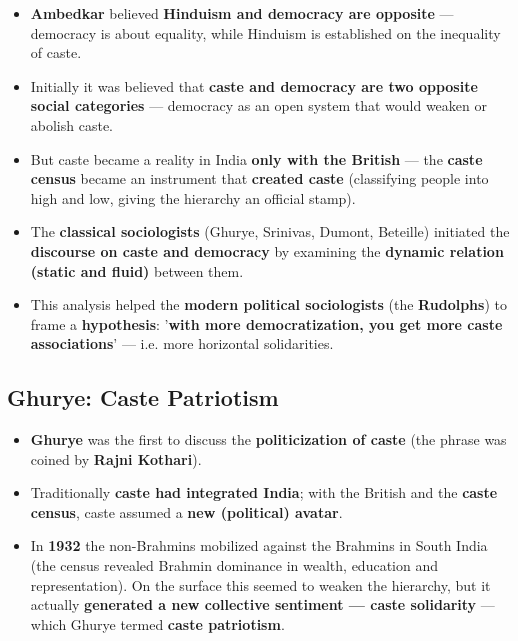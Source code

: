 \begin{KeyConcept}
\begin{itemize}
\item \textbf{Ambedkar} believed \textbf{Hinduism and democracy are opposite} --- democracy is about equality, while Hinduism is established on the inequality of caste.
\item Initially it was believed that \textbf{caste and democracy are two opposite social categories} --- democracy as an open system that would weaken or abolish caste.
\item But caste became a reality in India \textbf{only with the British} --- the \textbf{caste census} became an instrument that \textbf{created caste} (classifying people into high and low, giving the hierarchy an official stamp).
\end{itemize}
\end{KeyConcept}

\begin{KeyConcept}
\begin{itemize}
\item The \textbf{classical sociologists} (Ghurye, Srinivas, Dumont, Beteille) initiated the \textbf{discourse on caste and democracy} by examining the \textbf{dynamic relation (static and fluid)} between them.
\item This analysis helped the \textbf{modern political sociologists} (the \textbf{Rudolphs}) to frame a \textbf{hypothesis}: '\textbf{with more democratization, you get more caste associations}' --- i.e. more horizontal solidarities.
\end{itemize}
\end{KeyConcept}

\subsection{Ghurye: Caste Patriotism}

\begin{KeyConcept}
\begin{itemize}
\item \textbf{Ghurye} was the first to discuss the \textbf{politicization of caste} (the phrase was coined by \textbf{Rajni Kothari}).
\item Traditionally \textbf{caste had integrated India}; with the British and the \textbf{caste census}, caste assumed a \textbf{new (political) avatar}.
\item In \textbf{1932} the non-Brahmins mobilized against the Brahmins in South India (the census revealed Brahmin dominance in wealth, education and representation). On the surface this seemed to weaken the hierarchy, but it actually \textbf{generated a new collective sentiment --- caste solidarity} --- which Ghurye termed \textbf{caste patriotism}.
\end{itemize}
\end{KeyConcept}


